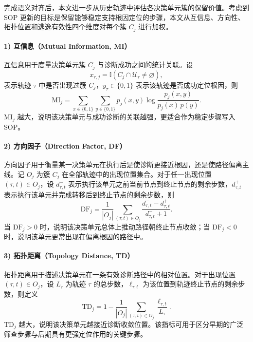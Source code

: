 完成语义对齐后，本文进一步从历史轨迹中评估各决策单元簇的保留价值。考虑到 SOP 更新的目标是保留能够稳定支持根因定位的步骤，本文从互信息、方向性、拓扑位置和逃逸有效性四个维度对每个簇 $C_j$ 进行加权。

\paragraph{1) 互信息（Mutual Information, MI）}
互信息用于度量决策单元簇 $C_j$ 与诊断成功之间的统计关联。设
\begin{equation}
x_{\tau,j}=\mathbb{I}(C_j \cap \mathcal{U}_{\tau}\neq \varnothing),
\end{equation}
表示轨迹 $\tau$ 中是否出现过簇 $C_j$，$y_{\tau}\in\{0,1\}$ 表示该轨迹是否成功定位根因，则
\begin{equation}
\mathrm{MI}_{j}=\sum_{x\in\{0,1\}}\sum_{y\in\{0,1\}}p_{j}(x,y)\log \frac{p_{j}(x,y)}{p_{j}(x)\,p(y)}.
\end{equation}
$\mathrm{MI}_{j}$ 越大，说明该决策单元与成功诊断的关联越强，更适合作为稳定步骤写入 SOP。

\paragraph{2) 方向因子（Direction Factor, DF）}
方向因子用于衡量某一决策单元在执行后是使诊断更接近根因，还是使路径偏离主线。记 $O_j$ 为簇 $C_j$ 在全部轨迹中的出现位置集合。对于任一出现位置 $(\tau,t)\in O_j$，设 $d^-_{\tau,t}$ 表示执行该单元之前当前节点到终止节点的剩余步数，$d^+_{\tau,t}$ 表示执行该单元并完成转移后到终止节点的剩余步数，则
\begin{equation}
\mathrm{DF}_{j}=\frac{1}{|O_j|}\sum_{(\tau,t)\in O_j}\frac{d^-_{\tau,t}-d^+_{\tau,t}}{d^-_{\tau,t}+1}.
\end{equation}
当 $\mathrm{DF}_{j}>0$ 时，说明该决策单元总体上推动路径朝终止节点收敛；当 $\mathrm{DF}_{j}<0$ 时，说明该单元更常出现在偏离根因的路径中。

\paragraph{3) 拓扑距离（Topology Distance, TD）}
拓扑距离用于描述决策单元在一条有效诊断路径中的相对位置。对于出现位置 $(\tau,t)\in O_j$，设 $L_{\tau}$ 为轨迹 $\tau$ 的总步数，$\ell_{\tau,t}$ 为该位置到轨迹终止节点的剩余步数，则定义
\begin{equation}
\mathrm{TD}_{j}=1-\frac{1}{|O_j|}\sum_{(\tau,t)\in O_j}\frac{\ell_{\tau,t}}{L_{\tau}}.
\end{equation}
$\mathrm{TD}_{j}$ 越大，说明该决策单元越接近诊断收敛位置。该指标可用于区分早期的广泛筛查步骤与后期具有更强定位作用的关键步骤。

